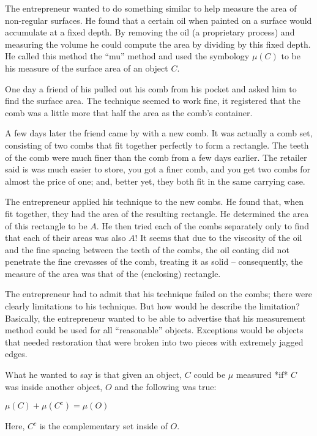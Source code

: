 \documentclass{article}
\begin{document}
The entrepreneur wanted to do something similar to help measure the area of 
non-regular surfaces. He found that a 
certain oil when painted on a surface would accumulate at a fixed depth. By 
removing the oil (a proprietary process) and measuring the volume he could 
compute the area by dividing by this fixed depth. He called this method the 
``mu'' method and used the symbology $\mu(C)$ to be his measure of the surface 
area of an object $C$.

One day a friend of his pulled out his comb from his pocket and asked him to 
find the surface area. The technique seemed to work fine, it registered that 
the comb was a little more that half the area as the comb's container.

A few days later the friend came by with a new comb. It was actually a comb 
set, consisting of two combs that fit together perfectly to form a rectangle.
The teeth of the comb were much finer than the comb from a few days earlier. 
The retailer said is was much easier to store, you got a finer comb, and you 
get two combs for almost the price of one; and, better yet, they both 
fit in the same carrying case.

The entrepreneur applied his technique to the new combs. 
He found that, when fit together, they had the area of the resulting rectangle.
He determined the area of this rectangle to be $A$. He then tried each of the 
combs separately only to find that each of their areas was also $A$!
It seems that due to the viscosity of the oil and the fine spacing between the 
teeth of the combs, the oil coating did not penetrate the fine crevasses of the 
comb, treating it as solid -- consequently, the measure of the area was that of the (enclosing) rectangle.


The entrepreneur had to admit that his technique failed on the combs; 
there were clearly limitations to his technique. 
But how would he describe the limitation? Basically, the entrepreneur wanted to 
be able to advertise that his measurement method could be used for all ``reasonable'' objects. 
Exceptions would be objects that needed restoration that were broken into two pieces with extremely jagged edges.

What he wanted to say is that given an object, $C$ could be $\mu$ measured 
*if* $C$ was inside another object, $O$ and the following was true:

$\mu(C) + \mu(C^c) = \mu(O)$

Here, $C^c$ is the complementary set inside of $O$.
\end{document}
